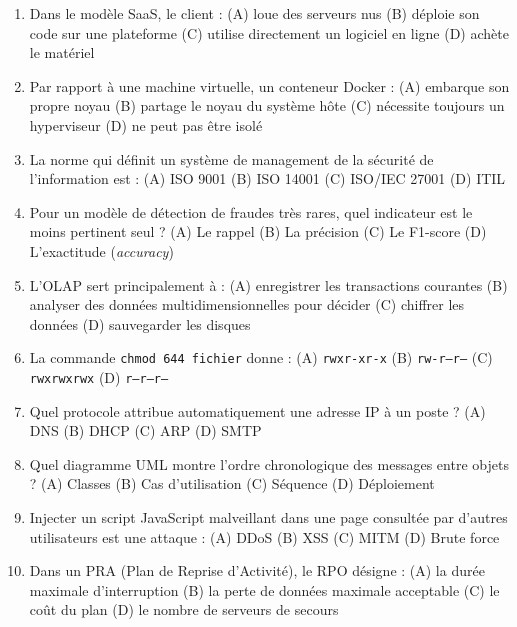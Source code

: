 \begin{enumerate}[leftmargin=*, label=\textbf{Q\arabic*.}, start=21]
    \newline (A) une file \quad (B) une pile \quad (C) un arbre \quad (D) un graphe
    \item Dans le modèle SaaS, le client :
    \newline (A) loue des serveurs nus \quad (B) déploie son code sur une plateforme
    \newline (C) utilise directement un logiciel en ligne \quad (D) achète le matériel
    \item Par rapport à une machine virtuelle, un conteneur Docker :
    \newline (A) embarque son propre noyau \quad (B) partage le noyau du système hôte
    \newline (C) nécessite toujours un hyperviseur \quad (D) ne peut pas être isolé
    \item La norme qui définit un système de management de la sécurité de l'information est :
    \newline (A) ISO 9001 \quad (B) ISO 14001 \quad (C) ISO/IEC 27001 \quad (D) ITIL
    \item Pour un modèle de détection de fraudes très rares, quel indicateur est le moins pertinent seul ?
    \newline (A) Le rappel \quad (B) La précision \quad (C) Le F1-score \quad (D) L'exactitude (\textit{accuracy})
    \item L'OLAP sert principalement à :
    \newline (A) enregistrer les transactions courantes \quad (B) analyser des données multidimensionnelles pour décider
    \newline (C) chiffrer les données \quad (D) sauvegarder les disques
    \item La commande \texttt{chmod 644 fichier} donne :
    \newline (A) \texttt{rwxr-xr-x} \quad (B) \texttt{rw-r--r--} \quad (C) \texttt{rwxrwxrwx} \quad (D) \texttt{r--r--r--}
    \item Quel protocole attribue automatiquement une adresse IP à un poste ?
    \newline (A) DNS \quad (B) DHCP \quad (C) ARP \quad (D) SMTP
    \item Quel diagramme UML montre l'ordre chronologique des messages entre objets ?
    \newline (A) Classes \quad (B) Cas d'utilisation \quad (C) Séquence \quad (D) Déploiement
    \item Injecter un script JavaScript malveillant dans une page consultée par d'autres utilisateurs est une attaque :
    \newline (A) DDoS \quad (B) XSS \quad (C) MITM \quad (D) Brute force
    \item Dans un PRA (Plan de Reprise d'Activité), le RPO désigne :
    \newline (A) la durée maximale d'interruption \quad (B) la perte de données maximale acceptable
    \newline (C) le coût du plan \quad (D) le nombre de serveurs de secours
\end{enumerate}

